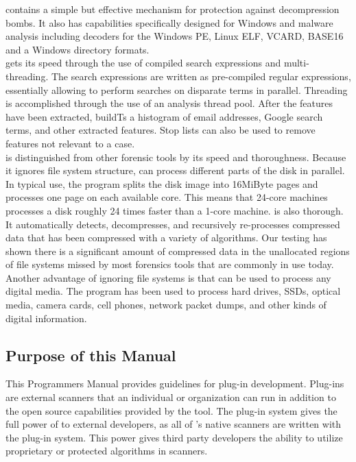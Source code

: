 \documentclass[11pt,fleqn]{article} %
\begin{document}
\bulk contains a simple but effective mechanism for protection against decompression bombs. It also has capabilities specifically designed for Windows and malware analysis including decoders for the Windows PE, Linux ELF, VCARD, BASE16 and a Windows directory formats.\\

\bulk gets its speed through the use of compiled search expressions and multi-threading. The search expressions are written as pre-compiled regular expressions, essentially allowing \bulk to perform searches on disparate terms in parallel. Threading is accomplished through the use of an analysis thread pool.  After the features have been extracted, \bulk buildTs a histogram of email addresses, Google search terms, and other extracted features. Stop lists can also be used to remove features not relevant to a case. \\

\bulk is distinguished from other forensic tools by its speed and thoroughness. Because it ignores file system structure, \bulk can process different parts of the disk in parallel. In typical use, the program splits the disk image into 16MiByte pages and processes one page on each available core. This means that 24-core machines processes a disk roughly 24 times faster than a 1-core machine. \bulk is also thorough. It automatically detects, decompresses, and recursively re-processes compressed data that has been compressed with a variety of algorithms. Our testing has shown there is a significant amount of compressed data in the unallocated regions of file systems missed by most forensics tools that are commonly in use today. Another advantage of ignoring file systems is that \bulk can be used to process any digital media. The program has been used to process hard drives, SSDs, optical media, camera cards, cell phones, network packet dumps, and other kinds of digital information.

\subsection{Purpose of this Manual}
This Programmers Manual provides guidelines for \bulk plug-in development. Plug-ins are external scanners that an individual or organization can run in addition to the open source capabilities provided by the tool. The plug-in system gives the full power of \bulk to external developers, as all of \bulk's native scanners are written with the plug-in system. This power gives third party developers the ability to utilize proprietary or protected algorithms in \bulk scanners. \\
\end{document}
